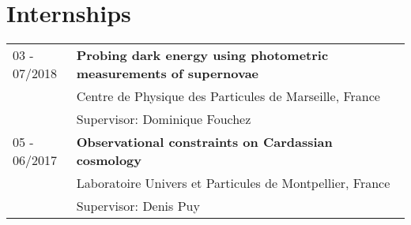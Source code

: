 \section{Internships}\label{internships}

\begin{table}[H]
    {\def\arraystretch{1.}\tabcolsep=0pt
    \begin{tabular}{p{0.16\linewidth}p{0.84\linewidth}}

    03 - 07/2018
        & \textbf{Probing dark energy using photometric measurements of supernovae} \\
        & Centre de Physique des Particules de Marseille, France \\
        & Supervisor: Dominique Fouchez \\[5pt]

    05 - 06/2017
        & \textbf{Observational constraints on Cardassian cosmology} \\
        & Laboratoire Univers et Particules de Montpellier, France \\
        & Supervisor: Denis Puy \\ %


    \end{tabular}}
\end{table}
